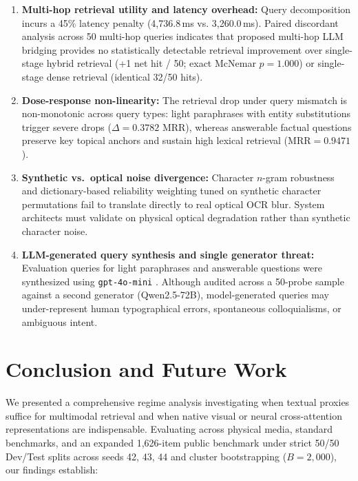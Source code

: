 \documentclass[conference]{IEEEtran}
\begin{document}
\begin{enumerate}
    \item \textbf{Multi-hop retrieval utility and latency overhead:} Query decomposition incurs a 45\% latency penalty (4,736.8\,ms vs. 3,260.0\,ms). Paired discordant analysis across 50 multi-hop queries indicates that proposed multi-hop LLM bridging provides no statistically detectable retrieval improvement over single-stage hybrid retrieval (+1 net hit / 50; exact McNemar $p = 1.000$) or single-stage dense retrieval (identical 32/50 hits).
    \item \textbf{Dose-response non-linearity:} The retrieval drop under query mismatch is non-monotonic across query types: light paraphrases with entity substitutions trigger severe drops ($\Delta = 0.3782$ MRR), whereas answerable factual questions preserve key topical anchors and sustain high lexical retrieval ($\text{MRR} = 0.9471$).
    \item \textbf{Synthetic vs.\ optical noise divergence:} Character $n$-gram robustness and dictionary-based reliability weighting tuned on synthetic character permutations fail to translate directly to real optical OCR blur. System architects must validate on physical optical degradation rather than synthetic character noise.
    \item \textbf{LLM-generated query synthesis and single generator threat:} Evaluation queries for light paraphrases and answerable questions were synthesized using \texttt{gpt-4o-mini} \cite{openai2024gpt4o}. Although audited across a 50-probe sample against a second generator (Qwen2.5-72B), model-generated queries may under-represent human typographical errors, spontaneous colloquialisms, or ambiguous intent.
\end{enumerate}

\section{Conclusion and Future Work}
We presented a comprehensive regime analysis investigating when textual proxies suffice for multimodal retrieval and when native visual or neural cross-attention representations are indispensable. Evaluating across physical media, standard benchmarks, and an expanded 1,626-item public benchmark under strict 50/50 Dev/Test splits across seeds 42, 43, 44 and cluster bootstrapping ($B=2{,}000$), our findings establish:
\end{document}
